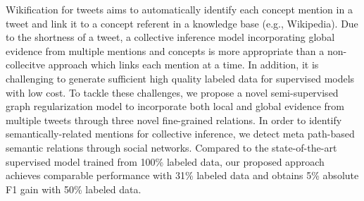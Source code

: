 Wikification for tweets aims to automatically identify each concept mention in a tweet and link it to a concept referent in a knowledge base (e.g., Wikipedia). Due to the shortness of a tweet, a collective inference model incorporating global evidence from multiple mentions and concepts is more appropriate than a non-collecitve approach which links each mention at a time. In addition, it is challenging to generate sufficient high quality labeled data for supervised models with low cost. To tackle these challenges, we propose a novel semi-supervised graph regularization model to incorporate both local and global evidence from multiple tweets through three novel fine-grained relations. In order to identify semantically-related mentions for collective inference, we detect meta path-based semantic relations through social networks. Compared to the state-of-the-art supervised model trained from 100\% labeled data, our proposed approach achieves comparable performance with 31\% labeled data and obtains 5\% absolute F1 gain with 50\% labeled data.
